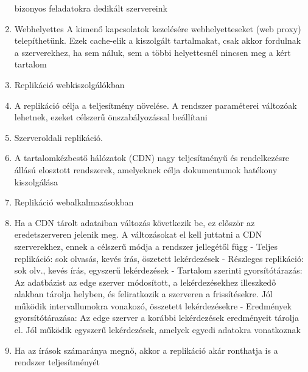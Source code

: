 \documentclass[twoside, a4paper, 12pt]{article}
\begin{document}
\begin{enumerate}
                bizonyos feladatokra dedikált szervereink
            \item  Webhelyettes
                A kimenő kapcsolatok kezelésére webhelyetteseket (web proxy) telepíthetünk. Ezek cache-elik a kiszolgált tartalmakat,
                csak akkor fordulnak a szerverekhez, ha sem náluk, sem a többi helyettesnél nincsen meg a kért tartalom
            \item  Replikáció webkiszolgálókban
            \item A replikáció célja a teljesítmény növelése. A rendszer paraméterei változóak lehetnek, ezeket célszerű önszabályozással beállítani
            \item  Szerveroldali replikáció.
            \item A tartalomkézbestő hálózatok (CDN) nagy teljesítményű és rendelkezésre állású elosztott rendszerek, amelyeknek célja
                dokumentumok hatékony kiszolgálása
            \item  Replikáció webalkalmazásokban
            \item Ha a CDN tárolt adataiban változás következik be, ez először az eredetszerveren jelenik meg. A változásokat el kell juttatni
                a CDN szerverekhez, ennek a célszerű módja a rendszer jellegétől függ
                - Teljes replikáció: sok olvasás, kevés írás, öszetett lekérdezések
                - Részleges replikáció: sok olv., kevés írás, egyszerű lekérdezések
                - Tartalom szerinti gyorsítótárazás: Az adatbázist az edge szerver módosított, a lekérdezésekhez illeszkedő alakban
                tárolja helyben, és feliratkozik a szerveren a frissítésekre. Jól működik intervallumokra vonakozó, összetett lekérdezésekre
                - Eredmények gyorsítótárazása: Az edge szerver a korábbi lekérdezések eredményeit tárolja el. Jól működik egyszerű
                lekérdezések, amelyek egyedi adatokra vonatkoznak
            \item Ha az írások számaránya megnő, akkor a replikáció akár ronthatja is a rendszer teljesítményét 
        \end{enumerate}
\end{document}
